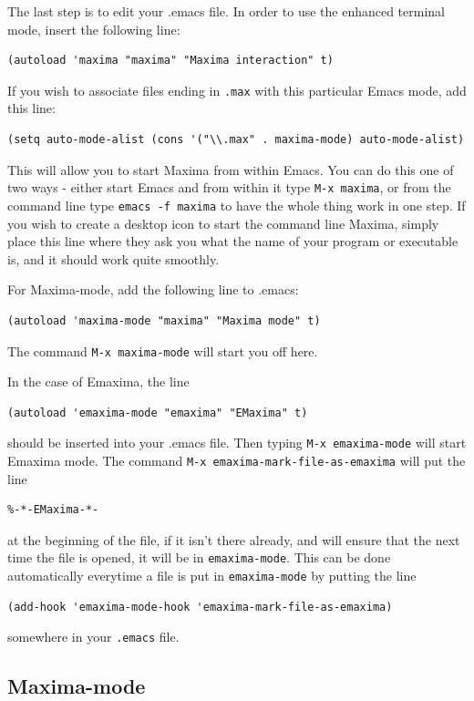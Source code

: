 The last step is to edit your .emacs file.  In order to use the enhanced terminal
mode, insert the following line:
\begin{verbatim}
(autoload 'maxima "maxima" "Maxima interaction" t)
\end{verbatim}
If you wish to associate files ending in \texttt{.max} with this particular
Emacs mode, add this line:
\begin{verbatim}
(setq auto-mode-alist (cons '("\\.max" . maxima-mode) auto-mode-alist)
\end{verbatim}
This will allow you to start Maxima from within Emacs.  You can do this
one of two ways - either start Emacs and from within it type \texttt{M-x maxima},
or from the command line type \texttt{emacs -f maxima} to have the whole thing
work in one step.  If you wish to create a desktop icon to start the command
line Maxima, simply place this line where they ask you what the name of your
program or executable is, and it should work quite smoothly.

For Maxima-mode, add the following line to .emacs:
\begin{verbatim}
(autoload 'maxima-mode "maxima" "Maxima mode" t)
\end{verbatim}
The command \texttt{M-x maxima-mode} will start you off here.

In the case of Emaxima, the line 
\begin{verbatim}
(autoload 'emaxima-mode "emaxima" "EMaxima" t)
\end{verbatim}
\noindent
should be inserted into your .emacs file.  Then typing
\texttt{M-x emaxima-mode} will start Emaxima mode.  The command 
\texttt{M-x emaxima-mark-file-as-emaxima} will put the line
\begin{verbatim}
%-*-EMaxima-*-
\end{verbatim}
\noindent
at the beginning of the file, if it isn't there already, and will ensure
that the next time the file is opened, it will be in \texttt{emaxima-mode}.  
This can be done automatically everytime a file is put in
\texttt{emaxima-mode} by putting the line
\begin{verbatim}
(add-hook 'emaxima-mode-hook 'emaxima-mark-file-as-emaxima)
\end{verbatim}
\noindent
somewhere in your \texttt{.emacs} file.


\subsection{Maxima-mode}

